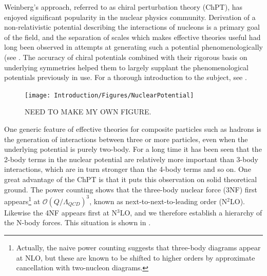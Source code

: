 Weinberg's approach, referred to as chiral perturbation theory (ChPT), has enjoyed significant popularity in the nuclear physics community. Derivation of a non-relativistic potential describing the interactions of nucleons is a primary goal of the field, and the separation of scales which makes effective theories useful had long been observed in attempts at generating such a potential phenomenologically (see . The accuracy of chiral potentials combined with their rigorous basis on underlying symmetries helped them to largely supplant the phenomenological potentials previously in use. For a thorough introduction to the subject, see \cite{Machleidt20111}.

\begin{figure}
\centering
\texttt{[image: Introduction/Figures/NuclearPotential]}
\caption[Test]{\label{fig:NuclearPotential} NEED TO MAKE MY OWN FIGURE.} 
\end{figure}

One generic feature of effective theories for composite particles such as hadrons is the generation of interactions between three or more particles, even when the underlying potential is purely two-body. For a long time it has been seen that the 2-body terms in the nuclear potential are relatively more important than 3-body interactions, which are in turn stronger than the 4-body terms and so on. One great advantage of the ChPT is that it puts this observation on solid theoretical ground. The power counting shows that the three-body nuclear force (3NF) first appears\footnote{Actually, the naive power counting suggests that three-body diagrams appear at NLO, but these are known to be shifted to higher orders by approximate cancellation with two-nucleon diagrams\cite{PhysRevC.49.2932}.} at $\mathcal{O}(Q/\Lambda_{QCD})^3$, known as next-to-next-to-leading order (N$^2$LO). Likewise the 4NF appears first at N$^3$LO, and we therefore establish a hierarchy of the N-body forces. This situation is shown in .

